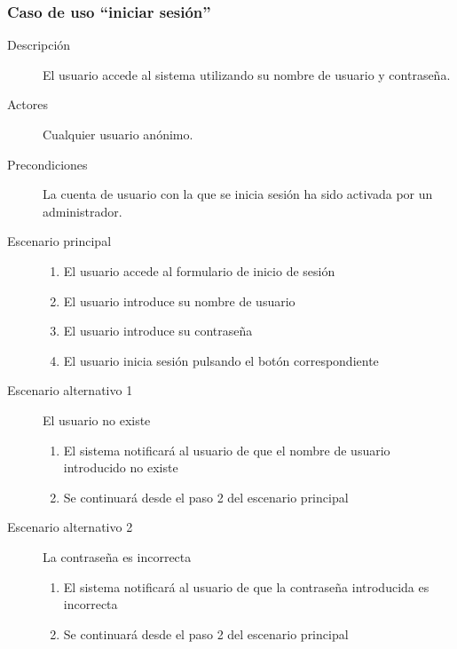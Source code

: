 \subsubsection{Caso de uso ``iniciar sesión''}
\begin{description}
\item[Descripción] El usuario accede al sistema utilizando su nombre de usuario y contraseña.
\item[Actores] Cualquier usuario anónimo.
\item[Precondiciones] La cuenta de usuario con la que se inicia sesión ha sido activada por un administrador.
\item[Escenario principal] \hfill
						 	\begin{enumerate}
							\item El usuario accede al formulario de inicio de sesión
							\item El usuario introduce su nombre de usuario
							\item El usuario introduce su contraseña
							\item El usuario inicia sesión pulsando el botón correspondiente
							\end{enumerate}
\item[Escenario alternativo 1] El usuario no existe
							\begin{enumerate}
							\item El sistema notificará al usuario de que el nombre de usuario introducido no existe
							\item Se continuará desde el paso 2 del escenario principal
							\end{enumerate}
\item [Escenario alternativo 2] La contraseña es incorrecta
							\begin{enumerate}
							\item El sistema notificará al usuario de que la contraseña introducida es incorrecta
							\item Se continuará desde el paso 2 del escenario principal
							\end{enumerate}							
\end{description}


